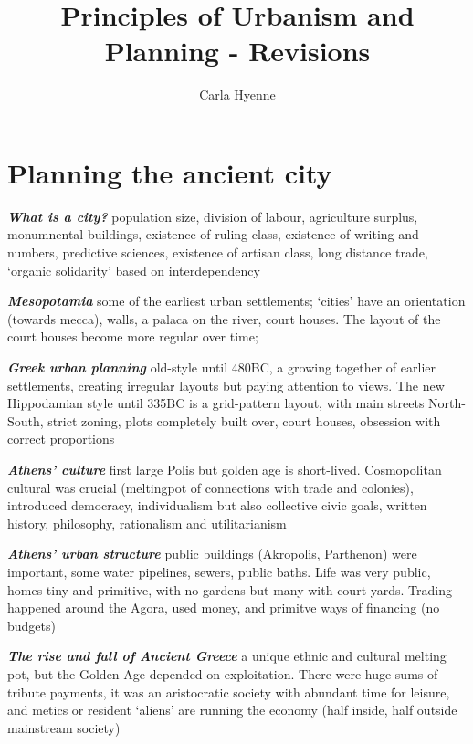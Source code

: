 \documentclass{article}
\title{Principles of Urbanism and Planning - Revisions}
\author{Carla Hyenne}
\newcommand{\bisection}[1]{\textbf{\textit{#1}}}
\newcommand{\alignedmarginpar}[1]{%
        \marginpar{\raggedright\small #1}
    }
\begin{document}
\maketitle

\tableofcontents

\pagebreak

\pagebreak
\section{Planning the ancient city}

\bisection{What is a city?}\alignedmarginpar{Childe 10 traits} population size, division of labour, agriculture surplus, monumnental buildings, existence of ruling class, existence of writing and numbers, predictive sciences, existence of artisan class, long distance trade, `organic solidarity' based on interdependency

\bisection{Mesopotamia} some of the earliest urban settlements; `cities' have an orientation (towards mecca), walls, a palaca on the river, court houses. The layout of the court houses become more regular over time;

\bisection{Greek urban planning}\alignedmarginpar{Athens, Olympia} old-style until 480BC, a growing together of earlier settlements, creating irregular layouts but paying attention to views. The new Hippodamian style until 335BC is a grid-pattern layout, with main streets North-South, strict zoning, plots completely built over, court houses, obsession with correct proportions

\bisection{Athens' culture} first large Polis but golden age is short-lived. Cosmopolitan cultural was crucial (meltingpot of connections with trade and colonies), introduced democracy, individualism but also collective civic goals, written history, philosophy, rationalism and utilitarianism

\bisection{Athens' urban structure} public buildings (Akropolis, Parthenon) were important, some water pipelines, sewers, public baths. Life was very public, homes tiny and primitive, with no gardens but many with court-yards. Trading happened around the Agora, used money, and primitve ways of financing (no budgets)

\bisection{The rise and fall of Ancient Greece}\alignedmarginpar{P. Hall} a unique ethnic and cultural melting pot, but the Golden Age depended on exploitation. There were huge sums of tribute payments, it was an aristocratic society with abundant time for leisure, and metics or resident `aliens' are running the economy (half inside, half outside mainstream society)
\end{document}
